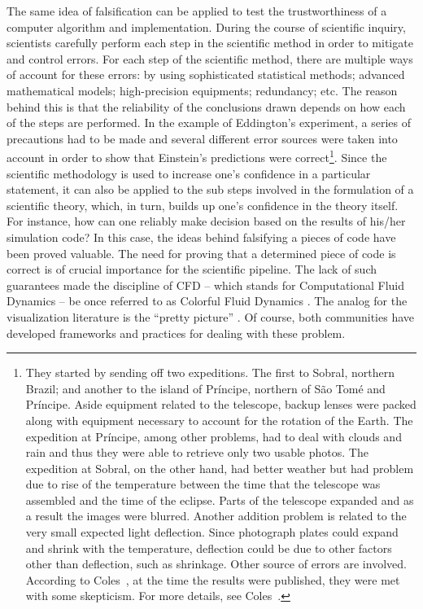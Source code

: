 The same idea of falsification can be applied to test the trustworthiness of a computer algorithm and implementation. During the course of scientific inquiry, scientists carefully perform each step in the scientific method in order to mitigate and control errors. For each step of the scientific method, there are multiple ways of account for these errors: by using sophisticated statistical methods; advanced mathematical models; high-precision equipments; redundancy; etc.  The reason behind this is that the reliability of the conclusions drawn depends on how each of the steps are performed. In the example of Eddington's experiment, a series of precautions had to be made and several different error sources were taken into account in order to show that Einstein's predictions were correct\footnote{They started by sending off two expeditions. The first to Sobral, northern Brazil; and another to the island of Pr\'incipe, northern of S\~ao Tom\'e and Pr\'incipe. Aside equipment related to the telescope, backup lenses were packed along with equipment necessary to account for the rotation of the Earth. The expedition at Pr\'incipe, among other problems, had to deal with clouds and rain and thus they were able to retrieve only two usable photos. The expedition at Sobral, on the other hand, had better weather but had problem due to rise of the temperature between the time that the telescope was assembled and the time of the eclipse. Parts of the telescope expanded and as a result the images were blurred. Another addition problem is related to the very small expected light deflection. Since photograph plates could expand and shrink with the temperature, deflection could be due to other factors other than deflection, such as shrinkage. Other source of errors are involved. According to Coles~\cite{coles2001einstein}, at the time the results were published, they were met with some skepticism. For more details, see Coles~\cite{coles2001einstein}.}. 
%
Since the scientific methodology is used to increase one's confidence in a particular statement, it can also be applied to the sub steps involved in the formulation of a scientific theory, which, in turn, builds up one's confidence in the theory itself. For instance, how can one reliably make decision based on the results of his/her simulation code? In this case, the ideas behind falsifying a pieces of code have been proved valuable. The need for proving that a determined piece of code is correct is of crucial importance for the scientific pipeline. The lack of such guarantees made the discipline of CFD -- which stands for Computational Fluid Dynamics -- be once referred to as Colorful Fluid Dynamics \cite{meroney2004wind}. The analog for the visualization literature is the  ``pretty picture'' \cite{Globus:1994:FWS:182452.182465}. Of course, both communities have developed frameworks and practices for dealing with these problem.


